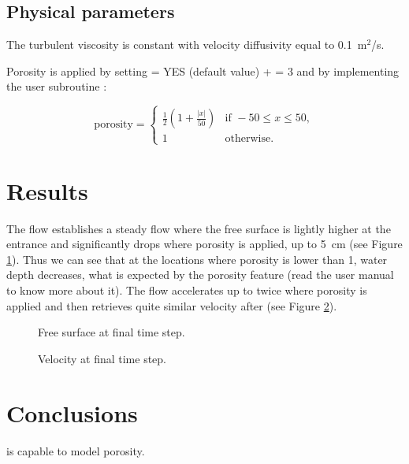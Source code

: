 \subsection{Physical parameters}

The turbulent viscosity is constant with velocity 
diffusivity equal to 0.1~m$^2$/s.

Porosity is applied by setting
 = YES (default value) +
 = 3 and
by implementing the user subroutine :

\begin{equation*}
\textrm{porosity} =
\left\{
  \begin{array}{cl}
    \frac{1}{2} \left(1 + \frac{|x|}{50} \right) & \textrm{if } -50 \le x \le 50, \\
    1 & \textrm{otherwise.}
  \end{array}
\right.
\end{equation*}


\section{Results}

The flow establishes a steady flow where the free surface is lightly higher
at the entrance and significantly drops where porosity is applied,
up to 5~cm (see Figure \ref{t2d:porosite:FreeSurf}).
Thus we can see that at the locations where porosity is lower than 1,
water depth decreases, what is expected by the porosity feature
(read the  user manual to know more about it).
The flow accelerates up to twice where porosity is applied and then retrieves
quite similar velocity after (see Figure \ref{t2d:porosite:Velo}).

\begin{figure}[H]
  \centering
  \caption{Free surface at final time step.}
  \label{t2d:porosite:FreeSurf}
\end{figure}

\begin{figure}[H]
  \centering
  \caption{Velocity at final time step.}
  \label{t2d:porosite:Velo}
\end{figure}

\section{Conclusions}

 is capable to model porosity.
